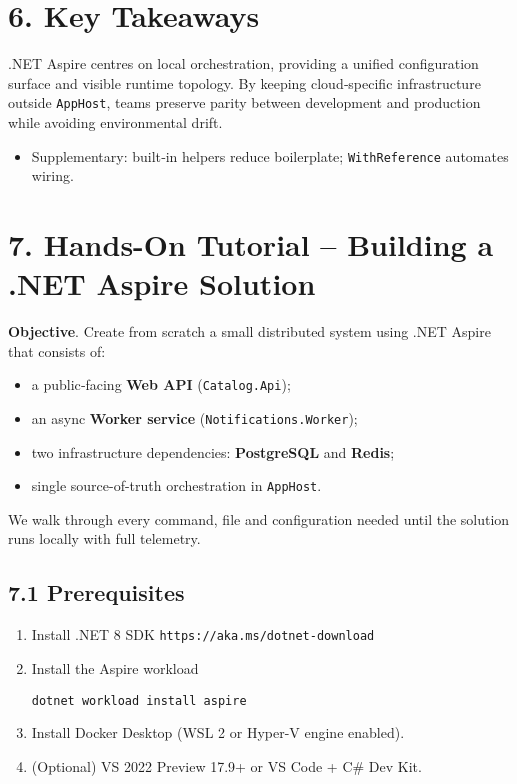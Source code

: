\documentclass[table]{article}
\begin{document}
\section*{6. \faStickyNote\enspace Key Takeaways}
.NET Aspire centres on local orchestration, providing a unified configuration surface and visible runtime topology.  By keeping cloud‑specific infrastructure outside \texttt{AppHost}, teams preserve parity between development and production while avoiding environmental drift.

\begin{itemize}
  \item Supplementary: built‑in helpers reduce boilerplate; \texttt{WithReference} automates wiring.
\end{itemize}

\section*{7. \faBook\enspace Hands-On Tutorial – Building a .NET Aspire Solution}
\noindent\textbf{Objective}. Create from scratch a small distributed system
using .NET Aspire that consists of:
\begin{itemize}
  \item a public‐facing \textbf{Web API} (\texttt{Catalog.Api});
  \item an async \textbf{Worker service} (\texttt{Notifications.Worker});
  \item two infrastructure dependencies: \textbf{PostgreSQL} and \textbf{Redis};
  \item single source-of-truth orchestration in \texttt{AppHost}.
\end{itemize}
We walk through every command, file and configuration needed until the solution
runs locally with full telemetry.

\subsection*{7.1 \faTerminal\enspace Prerequisites}
\begin{enumerate}
  \item Install .NET 8 SDK  
    \verb|https://aka.ms/dotnet-download|
  \item Install the Aspire workload  
\begin{verbatim}
dotnet workload install aspire
\end{verbatim}
  \item Install Docker Desktop (WSL 2 or Hyper-V engine enabled).
  \item (Optional) VS 2022 Preview 17.9+ or VS Code + C\# Dev Kit.
\end{enumerate}
\end{document}
